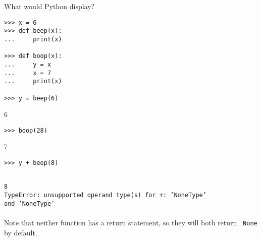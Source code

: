 \question What would Python display?
\begin{lstlisting}
>>> x = 6
>>> def beep(x):
...     print(x)

>>> def boop(x):
...     y = x
...     x = 7
...     print(x)

>>> y = beep(6)
\end{lstlisting}
\begin{solution}
6
\end{solution}
\begin{lstlisting}
>>> boop(28)
\end{lstlisting}
\begin{solution}
7
\end{solution}
\begin{lstlisting}
>>> y + beep(8)
\end{lstlisting}
\begin{solution}
{\tt ~ \\ 8 \\
TypeError: unsupported operand type(s) for +: 'NoneType' \\ and 'NoneType'} \\\\
Note that neither function has a return statement, so they will both return {\tt
None} by default.
\end{solution}
